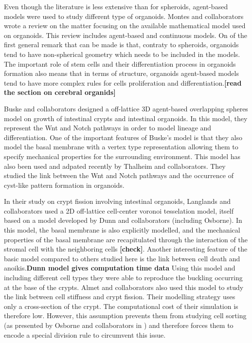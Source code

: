 \documentclass[11pt,a4paper]{article}
\begin{document}
Even though the literature is less extensive than for spheroids, agent-based models were used to study different type of organoids. Montes and collaborators wrote a review on the matter focusing on the available mathematical model used on organoids.\cite{Montes2019} This review includes agent-based and continuous models. On of the first general remark that can be made is that, contraty to spheroids, organoids tend to have non-spherical geometry which needs to be included in the models. The important role of stem cells and their differentiation process in organoids formation also means that in terms of structure, organoids agent-based models tend to have more complex rules for cells proliferation and differentiation.\textbf{[read the section on cerebral organids]}

Buske and collaborators designed a off-lattice 3D agent-based overlapping spheres model on growth of intestinal crypts \cite{Buske2011} and intestinal organoids.\cite{Buske2012} In this model, they represent the Wnt and Notch pathways in order to model lineage and differentiation. One of the important features of Buske's model is that they also model the basal membrane with a vertex type representation allowing them to specify mechanical properties for the surrounding environment. This model has also been used and adpated recently by Thalheim and collaborators. They studied the link between the Wnt and Notch pathways and the occurrence of cyst-like pattern formation in organoids.\cite{Thalheim2018}

In their study on crypt fission involving intestinal organoids, Langlands and collaborators used a 2D off-lattice cell-center voronoi tesselation model, itself based on a model developed by Dunn and collaborators (including Osborne)\cite{Dunn2012}.  In this model, the basal membrane is also explicitly modelled, and the mechanical properties of the basal membrane are recapitulated through the interaction of the stromal cell with the neighboring cells \textbf{[check]}. Another interesting feature of the basic model compared to others studied here is the link between cell death and anoikis.\textbf{Dunn model gives computation time data} Using this model and including different cell types they were able to reproduce the buckling occurring at the base of the crypts.\cite{Langlands2016} Almet and collaborators also used this model to study the link between cell stiffness and crypt fission.\cite{Almet2017} Their modelling strategy uses only a cross-section of the crypt. The computational cost of their simulation is therefore low. However, this assumption prevents them from studying cell sorting (as presented by Osborne and collaborators in \cite{Osborne2017}) and therefore forces them to encode a special division rule to circumvent this issue.
\end{document}
